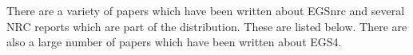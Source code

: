 
%
%
%
%
%
%
%
%
%


There are a variety of papers which have been written about EGSnrc and
several NRC reports which are part of the distribution.  These are
listed below.  There are also a large number of papers which have been
written about EGS4.

